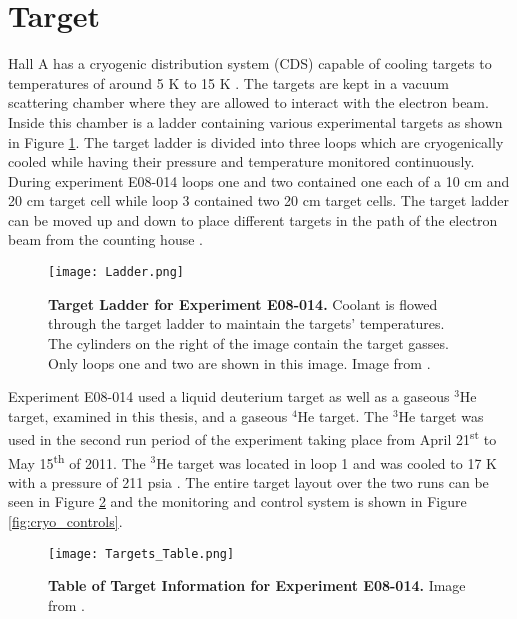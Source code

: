 \section{Target}
\label{sec:target}

Hall A has a cryogenic distribution system (CDS) capable of cooling targets to temperatures of around 5 K to 15 K \cite{Article:HallA}. The targets are kept in a vacuum scattering chamber where they are allowed to interact with the electron beam. Inside this chamber is a ladder containing various experimental targets as shown in Figure \ref{fig:ladder}. The target ladder is divided into three loops which are cryogenically cooled while having their pressure and temperature monitored continuously. During experiment E08-014 loops one and two contained one each of a 10 cm and 20 cm target cell while loop 3 contained two 20 cm target cells. The target ladder can be moved up and down to place different targets in the path of the electron beam from the counting house \cite{Thesis:Ye}.  

\begin{figure}[!ht]
\begin{center}
\texttt{[image: Ladder.png]}
\end{center}
\caption[Target Ladder for Experiment E08-014]{
{\bf{Target Ladder for Experiment E08-014.}} Coolant is flowed through the target ladder to maintain the targets' temperatures. The cylinders on the right of the image contain the target gasses. Only loops one and two are shown in this image. Image from \cite{Thesis:Ye}.}
\label{fig:ladder}
\end{figure}

Experiment E08-014 used a liquid deuterium target as well as a gaseous $^3$He target, examined in this thesis, and a gaseous $^4$He target. The $^3$He target was used in the second run period of the experiment taking place from April 21\textsuperscript{st} to May 15\textsuperscript{th} of 2011. The $^3$He target was located in loop 1 and was cooled to 17 K with a pressure of 211 psia \cite{Thesis:Ye}. The entire target layout over the two runs can be seen in Figure \ref{fig:targets} and the monitoring and control system is shown in Figure \ref{fig:cryo_controls}.

\begin{figure}[!ht]
\begin{center}
\texttt{[image: Targets\_Table.png]}
\end{center}
\caption[Table of Target Information for Experiment E08-014]{
{\bf{Table of Target Information for Experiment E08-014.}} Image from \cite{Thesis:Ye}.}
\label{fig:targets}
\end{figure}

